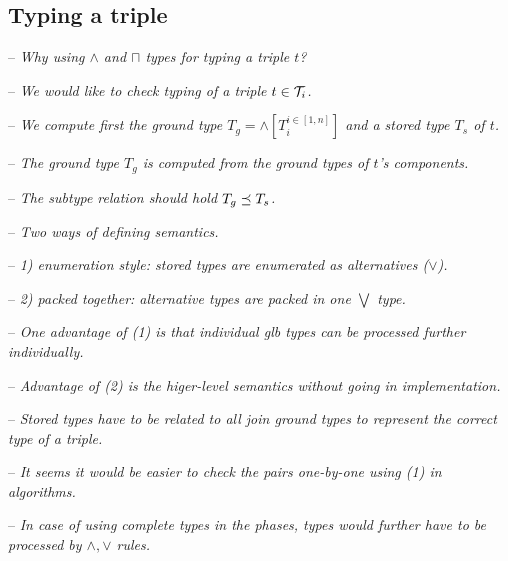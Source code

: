 \documentclass[runningheads]{llncs}
\newcommand{\T}{{\cal T}}
\newcommand{\memo}[1]{}
\newcommand{\notes}[1]{\noindent\begin{small}-- \emph{#1}\hfill\break\end{small}}
\newcommand{\nnotes}[1]{\indent\begin{small}-- \emph{#1}\hfill\break\end{small}}
\begin{document}
\memo{
\notes{If $p$ inherits from multiple $p'\succeq\/p$, then the above rule generates multiple types. Explain.}
\nnotes{The type is determined only if the domain and range of $p'\succeq\/p$ is defined.}
\nnotes{Otherwise, the domain and range shoud be $\top$. This should be included.}}

\memo{
Somewhere here, the inheritance should be noted.
Inheritance should be treated in knowledge graphs!
Predicates inherit in the same way as the classes.

\notes{What is the meaning of triple types that are \emph{not comparable} ($\not\sim$).}
\nnotes{1. This can be either that we have two $p$ roots with unrelated MIN triple types.}
\nnotes{This is possible only if $p$ is defined for semantically different concepts.}
\nnotes{2. Two $p$-rooted but unrelated stored types through multiple inheritance.}
\nnotes{Therefore, we can have more than one stored MIN types.}}

\memo{
The implementation view of the above rule is as follows. The schema
triples are obtained from the inherited values of the predicates
rdfs:domain and rdfs:range. The inherited values have to be the
closest when traveling from property $p$ towards the more general
properties.}







\subsection{Typing a triple}

\notes{Why using $\land$ and $\sqcap$ types for typing a triple $t$?}
\nnotes{We would like to check typing of a triple $t\in\T_i$.}
\nnotes{We compute first the ground type $T_g=\land[T_i^{i\in[1,n]}]$ and a stored type $T_s$ of $t$.}
\nnotes{The ground type $T_g$ is computed from the ground types of $t$'s components.}
\nnotes{The subtype relation should hold $T_g\preceq\/T_s$.}

\notes{Two ways of defining semantics.}
\notes{1) enumeration style: stored types are enumerated as alternatives ($\lor$).}
\notes{2) packed together: alternative types are packed in one $\bigvee$ type.}
\notes{One advantage of (1) is that individual glb types can be processed further individually.}
\notes{Advantage of (2) is the higer-level semantics without going in implementation.}

\notes{Stored types have to be related to all join ground types to represent the correct type of a triple.}
\notes{It seems it would be easier to check the pairs one-by-one using (1) in algorithms.}
\notes{In case of using complete types in the phases, types would further have to be processed by $\land,\lor$ rules.}
\end{document}
